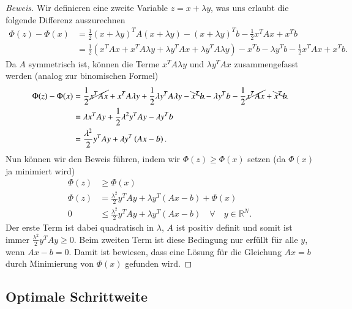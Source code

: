 \begin{proof}[Beweis]
Wir definieren eine zweite Variable $z = x + \lambda y$, was uns erlaubt die folgende Differenz auszurechnen
\begin{align}
	\Phi(z) - \Phi(x) 
	&= 
	\frac{1}{2} \left(x + \lambda y\right) ^T A \left(x + \lambda y\right)  - \left(x + \lambda y\right) ^T b
	- 
	\frac{1}{2} x^T A x + x^T b 
	\\
	&= 
	\frac{1}{2} \left(x^T A x + x^T A \lambda y + \lambda y^T A x + \lambda y^T A \lambda y\right) 
	-
	x^T b - \lambda y^T b
	- 
	\frac{1}{2} x^T A x + x^T b .	
\end{align}
Da $A$ symmetrisch ist, können die Terme $x^T A \lambda y$ und $\lambda y^T A x$ zusammengefasst werden (analog zur binomischen Formel)
\begin{align}
	\Phi(z) - \Phi(x) 
	&= 
	\frac{1}{2}\cancel{ x^T A x} + x^T A \lambda y + \frac{1}{2} \lambda y^T A \lambda y
	-
	\bcancel{x^T b} - \lambda y^T b
	- 
	\frac{1}{2}\cancel{ x^T A x} + \bcancel{x^T b} \\
	&=
	\lambda x^T A y	+ \frac{1}{2} {\lambda}^2 y^T A y - \lambda y^T b \\
	&=
	\frac{{\lambda}^2}{2} y^T A y + \lambda y^T \left(Ax -b \right) .
\end{align}
Nun können wir den Beweis führen, indem wir $\Phi(z) \ge \Phi(x)$ setzen (da $\Phi(x)$ ja minimiert wird)
\begin{align}
	\Phi(z) &\ge \Phi(x) 
	\\
	\Phi(z) &= \frac{{\lambda}^2}{2} y^T A y + \lambda y^T \left(Ax -b \right) + \Phi(x) 
	\\
	0 &\le \frac{{\lambda}^2}{2} y^T A y + \lambda y^T \left(Ax - b \right) \quad \forall \quad y \in \mathbb{R}^N  .
\end{align}
Der erste Term ist dabei quadratisch in $\lambda$, $A$ ist positiv definit und somit ist immer $\frac{{\lambda}^2}{2} y^T A y \ge 0$.
Beim zweiten Term ist diese Bedingung nur erfüllt für alle $y$, wenn $Ax - b = 0$.
Damit ist bewiesen, dass eine Lösung für die Gleichung $Ax = b$ durch Minimierung von $\Phi(x)$ gefunden wird.
\end{proof}


\subsection{Optimale Schrittweite \label{cg:subsection:schrittweite}}

